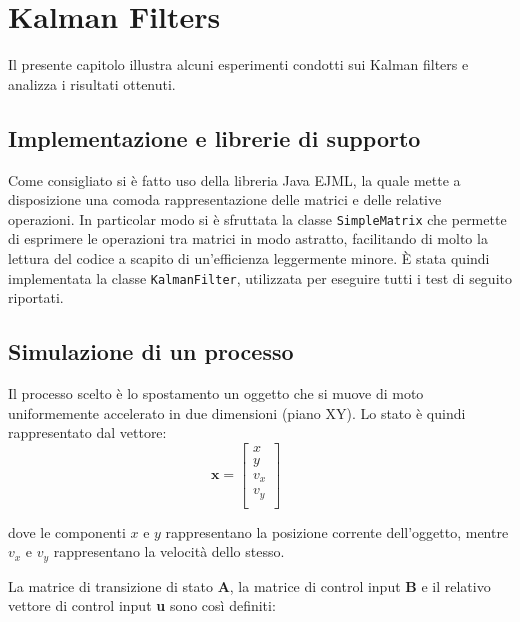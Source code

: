 \chapter{Kalman Filters}

Il presente capitolo illustra alcuni esperimenti condotti sui Kalman filters e analizza i risultati ottenuti.

\section{Implementazione e librerie di supporto}
Come consigliato si è fatto uso della libreria Java EJML, la quale mette a disposizione una comoda rappresentazione delle matrici e delle relative operazioni. In particolar modo si è sfruttata la classe \texttt{SimpleMatrix} che permette di esprimere le operazioni tra matrici in modo astratto, facilitando di molto la lettura del codice a scapito di un'efficienza leggermente minore. È stata quindi implementata la classe \texttt{KalmanFilter}, utilizzata per eseguire tutti i test di seguito riportati.

\section{Simulazione di un processo}

Il processo scelto è lo spostamento un oggetto che si muove di moto uniformemente accelerato in due dimensioni (piano XY). Lo stato è quindi rappresentato dal vettore:
\begin{equation*}
\textbf{x} = 
\begin{bmatrix}
x \\
y \\
v_x \\
v_y \\
\end{bmatrix}
\qquad
\end{equation*}

dove le componenti $x$ e $y$ rappresentano la posizione corrente dell'oggetto, mentre $v_x$ e $v_y$ rappresentano la velocità dello stesso.

La matrice di transizione di stato \textbf{A}, la matrice di control input \textbf{B} e il relativo vettore di control input \textbf{u} sono così definiti:

